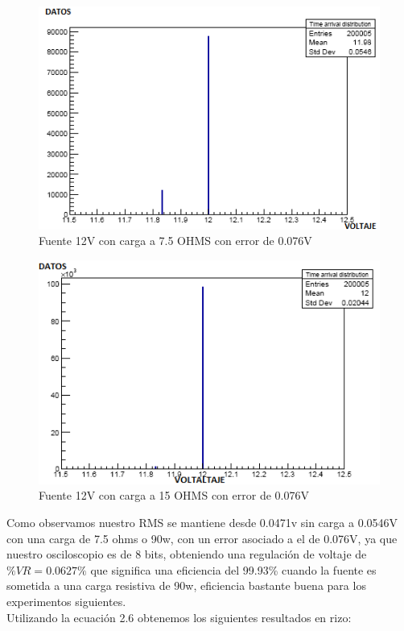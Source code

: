 \begin{figure}[H]
\centering
\includegraphics[width=12cm]{Capitulo3/figs/75ohms.png}
\caption{Fuente 12V con carga a 7.5 OHMS con error de 0.076V}
\end{figure}

\begin{figure}[H]
\centering
\includegraphics[width=12cm]{Capitulo3/figs/15ohms.png}
\caption{Fuente 12V con carga a 15 OHMS con error de 0.076V}
\end{figure}

Como observamos nuestro RMS se mantiene desde 0.0471v sin carga a 0.0546V con una carga de 7.5 ohms o 90w, con un error asociado a el de 0.076V, ya que nuestro osciloscopio es de 8 bits, obteniendo una regulación de voltaje de $\%VR=0.0627\% $ que significa una eficiencia del 99.93\% cuando la fuente es sometida a una carga resistiva de 90w, eficiencia bastante buena para los experimentos siguientes. \\

Utilizando la ecuación 2.6 obtenemos los siguientes resultados en rizo:\\

